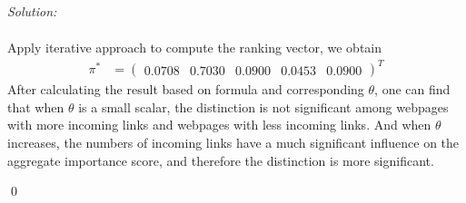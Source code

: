 \documentclass[12pt]{article}
\newenvironment{sol}
    {\emph{Solution:}
    }
    {
    \qed
    }
\begin{document}
\begin{sol}
\begin{align*}
	\end{align*}
	Apply iterative approach to compute the ranking vector, we obtain
	\begin{align*}
	\pi^* &= \begin{pmatrix}0.0708 & 0.7030 & 0.0900 & 0.0453 & 0.0900\end{pmatrix}^T
	\end{align*}
	After calculating the result based on formula and corresponding $\theta$, one can find that when $\theta$ is a small scalar, the distinction is not significant among webpages with more incoming links and webpages with less incoming links. And when $\theta$ increases, the numbers of incoming links have a much significant influence on the aggregate importance score, and therefore the distinction is more significant.
\end{sol}
	
\end{document}
